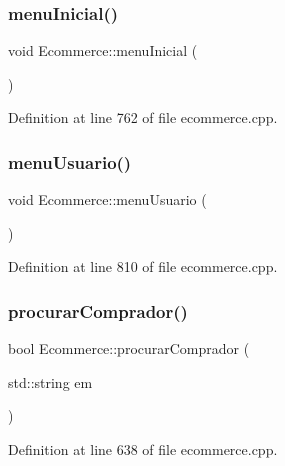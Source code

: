 \subsubsection{\texorpdfstring{menu\+Inicial()}{menuInicial()}}
{\footnotesize\ttfamily void Ecommerce\+::menu\+Inicial (\begin{DoxyParamCaption}{ }\end{DoxyParamCaption})}



Definition at line 762 of file ecommerce.\+cpp.

\mbox{\label{class_ecommerce_a3a26138c4418072b5b11995201a4abe1}} 
\subsubsection{\texorpdfstring{menu\+Usuario()}{menuUsuario()}}
{\footnotesize\ttfamily void Ecommerce\+::menu\+Usuario (\begin{DoxyParamCaption}{ }\end{DoxyParamCaption})}



Definition at line 810 of file ecommerce.\+cpp.

\mbox{\label{class_ecommerce_aff2a4db0aedf0f191269426cd76dac53}} 
\subsubsection{\texorpdfstring{procurar\+Comprador()}{procurarComprador()}}
{\footnotesize\ttfamily bool Ecommerce\+::procurar\+Comprador (\begin{DoxyParamCaption}\item[{std\+::string}]{em }\end{DoxyParamCaption})}



Definition at line 638 of file ecommerce.\+cpp.

\mbox{\label{class_ecommerce_a9f64f83f2837b0962add2ca223ccca93}} 
